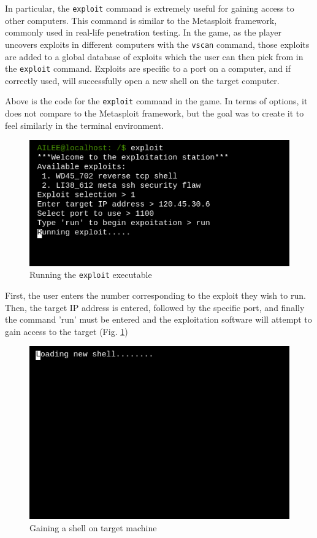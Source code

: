 \documentclass[conference]{IEEEtran}
\begin{document}
In particular, the \texttt{exploit} command is extremely useful for gaining access to other computers.  This command is similar to the Metasploit framework, commonly used in real-life penetration testing.  In the game, as the player uncovers exploits in different computers with the \texttt{vscan} command, those exploits are added to a global database of exploits which the user can then pick from in the \texttt{exploit} command.  Exploits are specific to a port on a computer, and if correctly used, will successfully open a new shell on the target computer.



Above is the code for the \texttt{exploit} command in the game. In terms of options, it does not compare to the Metasploit framework, but the goal was to create it to feel similarly in the terminal environment.

\begin{figure}[h]
	\centerline{\includegraphics[scale=2]{exploit-pic}}
	\caption{Running the \texttt{exploit} executable}
	\label{fig:exploit-pic}
\end{figure}

First, the user enters the number corresponding to the exploit they wish to run. Then, the target IP address is entered, followed by the specific port, and finally the command 'run' must be entered and the exploitation software will attempt to gain access to the target (Fig. \ref{fig:exploit-pic}) 

\begin{figure}[h]
	\centerline{\includegraphics[scale=2]{loading-new-shell}}
	\caption{Gaining a shell on target machine}
	\label{fig:loading}
\end{figure}
\end{document}
